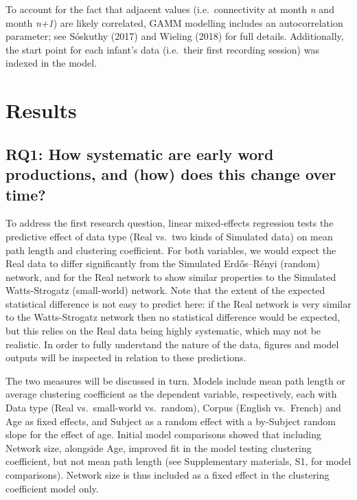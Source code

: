 \documentclass[
  man]{apa6}
\begin{document}
To account for the fact that adjacent values (i.e.~connectivity at month \emph{n} and month \emph{n+1}) are likely correlated, GAMM modelling includes an autocorrelation parameter; see Sóskuthy (2017) and Wieling (2018) for full details. Additionally, the start point for each infant's data (i.e.~their first recording session) was indexed in the model.

\section{Results}\label{results}

\subsection{RQ1: How systematic are early word productions, and (how) does this change over time?}\label{rq1-how-systematic-are-early-word-productions-and-how-does-this-change-over-time}

To address the first research question, linear mixed-effects regression tests the predictive effect of data type (Real vs.~two kinds of Simulated data) on mean path length and clustering coefficient. For both variables, we would expect the Real data to differ significantly from the Simulated Erdős--Rényi (random) network, and for the Real network to show similar properties to the Simulated Watts-Strogatz (small-world) network. Note that the extent of the expected statistical difference is not easy to predict here: if the Real network is very similar to the Watts-Strogatz network then no statistical difference would be expected, but this relies on the Real data being highly systematic, which may not be realistic. In order to fully understand the nature of the data, figures and model outputs will be inspected in relation to these predictions.

The two measures will be discussed in turn. Models include mean path length or average clustering coefficient as the dependent variable, respectively, each with Data type (Real vs.~small-world vs.~random), Corpus (English vs.~French) and Age as fixed effects, and Subject as a random effect with a by-Subject random slope for the effect of age. Initial model comparisons showed that including Network size, alongside Age, improved fit in the model testing clustering coefficient, but not mean path length (see Supplementary materials, S1, for model comparisons). Network size is thus included as a fixed effect in the clustering coefficient model only.
\end{document}

